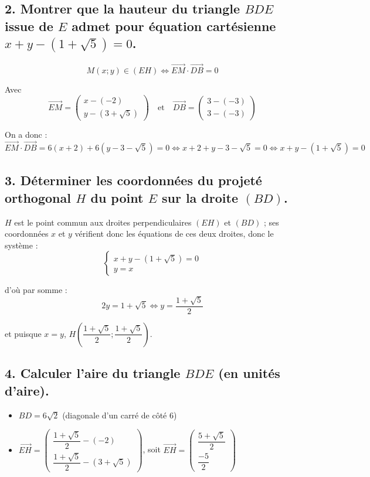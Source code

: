 	\subsection*{2. Montrer que la hauteur du triangle $BDE$ issue de $E$ admet pour équation cartésienne $x + y - (1 + \sqrt{5}) = 0$.}
	
	\[
	M(x; y) \in (EH) \iff \overrightarrow{EM} \cdot \overrightarrow{DB} = 0
	\]
	
	Avec
	\[
	\overrightarrow{EM} = \begin{pmatrix}
		x - (-2) \\
		y - (3 + \sqrt{5})
	\end{pmatrix}
	\quad \text{et} \quad \overrightarrow{DB} = \begin{pmatrix}
		3 - (-3) \\
		3 - (-3)
	\end{pmatrix}
	\]
	
	On a donc :
	\[
	\overrightarrow{EM} \cdot \overrightarrow{DB} = 6(x + 2) + 6(y - 3 - \sqrt{5}) = 0 \iff x + 2 + y - 3 - \sqrt{5} = 0 \iff x + y - (1 + \sqrt{5}) = 0
	\]
	
	\subsection*{3. Déterminer les coordonnées du projeté orthogonal $H$ du point $E$ sur la droite $(BD)$.}
	
	$H$ est le point commun aux droites perpendiculaires $(EH)$ et $(BD)$ ; ses coordonnées $x$ et $y$ vérifient donc les équations de ces deux droites, donc le système :
	\[
	\begin{cases}
		x + y - (1 + \sqrt{5}) = 0 \\
		y = x
	\end{cases}
	\]
	
	d'où par somme :
	\[
	2y = 1 + \sqrt{5} \iff y = \dfrac{1 + \sqrt{5}}{2}
	\]
	
	et puisque $x = y$, $H\left( \dfrac{1 + \sqrt{5}}{2}; \dfrac{1 + \sqrt{5}}{2} \right)$.
	
	\subsection*{4. Calculer l’aire du triangle $BDE$ (en unités d’aire).}
	
	\begin{itemize}
		\item $BD = 6\sqrt{2}$ (diagonale d’un carré de côté 6)
		\item $\overrightarrow{EH} = \begin{pmatrix}
			\dfrac{1 + \sqrt{5}}{2} - (-2) \\
			\dfrac{1 + \sqrt{5}}{2} - (3 + \sqrt{5})
		\end{pmatrix}$, soit $\overrightarrow{EH} = \begin{pmatrix}
			\dfrac{5 + \sqrt{5}}{2} \\
			\dfrac{-5}{2}
		\end{pmatrix}$
	\end{itemize}
	
